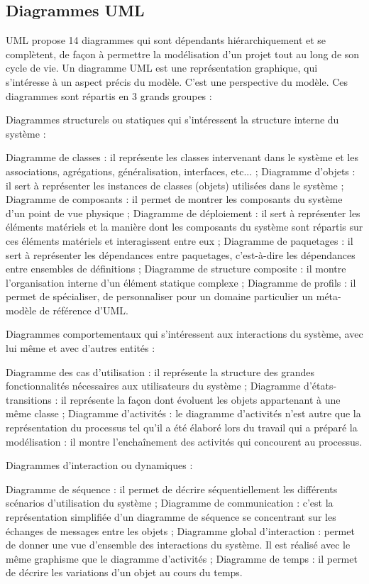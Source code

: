 \subsection{Diagrammes UML}
UML propose 14 diagrammes qui sont dépendants hiérarchiquement et se complètent, de façon à permettre la modélisation d'un projet tout au long de son cycle de vie. Un diagramme UML est une représentation graphique, qui s'intéresse à un aspect précis du modèle. C'est une perspective du modèle. Ces diagrammes sont répartis en 3 grands groupes :
\begin{itemize}
	\itemcheck Diagrammes structurels ou statiques qui s'intéressent la structure interne du système :
	\begin{itemize}
		\itemtirait Diagramme de classes : il représente les classes intervenant dans le système et les associations, agrégations, généralisation, interfaces, etc... ;
		\itemtirait Diagramme d'objets : il sert à représenter les instances de classes (objets) utilisées dans le système ;
		\itemtirait Diagramme de composants : il permet de montrer les composants du système d'un point de vue physique ;
		\itemtirait Diagramme de déploiement : il sert à représenter les éléments matériels et la manière dont les composants du système sont répartis sur ces éléments matériels et interagissent entre eux ;
		\itemtirait Diagramme de paquetages : il sert à représenter les dépendances entre paquetages, c’est-à-dire les dépendances entre ensembles de définitions ;
		\itemtirait Diagramme de structure composite : il montre l’organisation interne d’un élément statique complexe ;
		\itemtirait Diagramme de profils : il permet de spécialiser, de personnaliser pour un domaine particulier un méta-modèle de référence d'UML.
	\end{itemize}
	\itemcheck Diagrammes comportementaux qui s'intéressent aux interactions du système, avec lui même et avec d'autres entités : 
	\begin{itemize}
		\itemtirait Diagramme des cas d'utilisation : il représente la structure des grandes fonctionnalités nécessaires aux utilisateurs du système ;
		\itemtirait Diagramme d'états-transitions : il représente la façon dont évoluent les objets appartenant à une même classe ;
		\itemtirait Diagramme d'activités : le diagramme d'activités n'est autre que la représentation du processus tel qu'il a été élaboré lors du travail qui a préparé la modélisation : il montre l'enchaînement des activités qui concourent au processus.
	\end{itemize}
	\itemcheck Diagrammes d’interaction ou dynamiques :
	\begin{itemize}
		\itemtirait Diagramme de séquence : il permet de décrire séquentiellement les différents scénarios d’utilisation du système ;
		\itemtirait Diagramme de communication : c’est la représentation simplifiée d'un diagramme de séquence se concentrant sur les échanges de messages entre les objets ;
		\itemtirait Diagramme global d'interaction : permet de donner une vue d’ensemble des interactions du système. Il est réalisé avec le même graphisme que le diagramme d’activités ;
		\itemtirait Diagramme de temps : il permet de décrire les variations d'un objet au cours du temps.
	\end{itemize}
\end{itemize}
